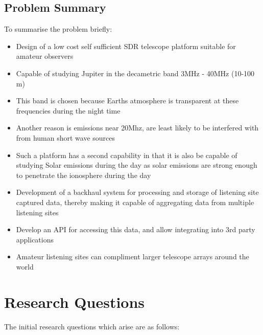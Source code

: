 \documentclass[runningheads,a4paper]{llncs}
\begin{document}
\subsection*{Problem Summary}

To summarise the problem briefly:

\begin{itemize}
  \item Design of a low cost self sufficient SDR telescope platform suitable for amateur observers
  \item Capable of studying Jupiter in the decametric band 3MHz - 40MHz (10-100 m)
  \item This band is chosen because Earths atmosphere is transparent at these frequencies during the night time
  \item Another reason is emissions near 20Mhz, are least likely to be interfered with from human short wave sources
  \item Such a platform has a second capability in that it is also be capable of studying Solar emissions during the day as solar emissions are strong enough to penetrate the ionosphere during the day
  \item Development of a backhaul system for processing and storage of listening site captured data, thereby making it capable of aggregating data from multiple listening sites
  \item Develop an API for accessing this data, and allow integrating into 3rd party applications
  \item Amateur listening sites can compliment larger telescope arrays around the world
\end{itemize}


%
%
\section*{Research Questions}
The initial research questions which arise are as follows:
\end{document}
